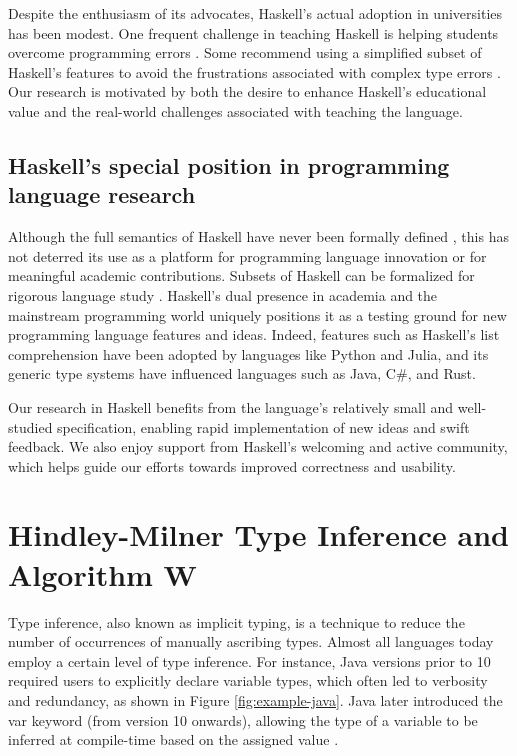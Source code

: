 Despite the enthusiasm of its advocates, Haskell's actual adoption in universities has been modest. One frequent challenge in teaching Haskell is helping students overcome programming errors \cite{Jun2000-yu, Tirronen2015-nr}. Some recommend using a simplified subset of Haskell's features to avoid the frustrations associated with complex type errors \cite{Heeren2003-mz}. Our research is motivated by both the desire to enhance Haskell's educational value and the real-world challenges associated with teaching the language.

\subsection{Haskell's special position in programming language research}

Although the full semantics of Haskell have never been formally defined \cite{Hudak2007-kn}, this has not deterred its use as a platform for programming language innovation or for meaningful academic contributions. Subsets of Haskell can be formalized for rigorous language study \cite{FaxEn2002-nd}. Haskell's dual presence in academia and the mainstream programming world uniquely positions it as a testing ground for new programming language features and ideas. Indeed, features such as Haskell's list comprehension have been adopted by languages like Python and Julia, and its generic type systems have influenced languages such as Java, C\#, and Rust.

Our research in Haskell benefits from the language's relatively small and well-studied specification, enabling rapid implementation of new ideas and swift feedback. We also enjoy support from Haskell's welcoming and active community, which helps guide our efforts towards improved correctness and usability.

\section{Hindley-Milner Type Inference and Algorithm W}

Type inference, also known as implicit typing, is a technique to reduce the number of occurrences of manually ascribing types. Almost all languages today employ a certain level of type inference. For instance, Java versions prior to 10 required users to explicitly declare variable types, which often led to verbosity and redundancy, as shown in Figure \ref{fig:example-java}. Java later introduced the var keyword (from version 10 onwards), allowing the type of a variable to be inferred at compile-time based on the assigned value \cite{noauthor_undated-an}.  

